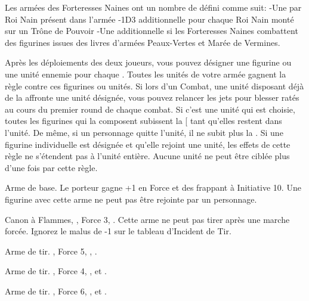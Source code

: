 \armyspecialruleentry{\ancientgrudge}

Les armées des Forteresses Naines ont un nombre de \ancientgrudges défini comme suit:
\newline-Une \ancientgrudge par Roi Nain présent dans l'armée
\newline-1D3 \ancientgrudge additionnelle pour chaque Roi Nain monté sur un Trône de Pouvoir
\newline-Une \ancientgrudge additionnelle si les Forteresses Naines combattent des figurines issues des livres d'armées Peaux-Vertes et Marée de Vermines.

Après les déploiements des deux joueurs, vous pouvez désigner une figurine ou une unité ennemie pour chaque \ancientgrudge{}. Toutes les unités de votre armée gagnent la règle \hatred contre ces figurines ou unités. Si lors d'un Combat, une unité disposant déjà de la \hatred affronte une unité désignée, vous pouvez relancer les jets pour blesser ratés au cours du premier round de chaque combat. Si c’est une unité qui est choisie, toutes les figurines qui la composent subissent la \hatred[{} tant qu’elles restent dans l’unité. De même, si un personnage quitte l'unité, il ne subit plus la \hatred{}. Si une figurine individuelle est désignée et qu'elle rejoint une unité, les effets de cette règle ne s’étendent pas à l’unité entière. Aucune unité ne peut être ciblée plus d'une fois par cette règle. 

\closearmyspecialrules

\vspace*{1.5cm}
\startarmyarmoury

\startitemlistonecol

\listitemonecol{\whirlingchainsofdoom} Arme de base. Le porteur gagne +1 en Force et des  frappant à Initiative 10. Une figurine avec cette arme ne peut pas être rejointe par un personnage.

\listitemonecol{\flameculverin} Canon à Flammes, , Force 3, \flamingattacks. Cette arme ne peut pas tirer après une marche forcée. Ignorez le malus de -1 sur le tableau d'Incident de Tir.

\listitemonecol{\forgegun} Arme de tir. , Force 5, \flamingattacks, \quicktofire.

\listitemonecol{\swiwelgun} Arme de tir. , Force 4, ,   et \quicktofire.

\listitemonecol{\wyrmslayerrocket} Arme de tir. , Force 6, \flamingattacks,  et \reload{}.

